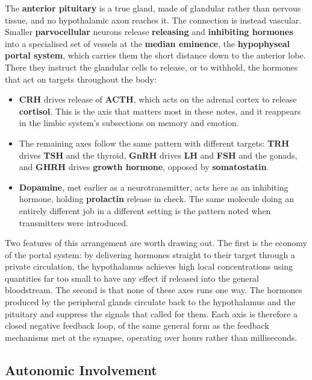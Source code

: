 \documentclass[11pt]{article}
\begin{document}
The \textbf{anterior pituitary} is a true gland, made of glandular rather than nervous tissue, and no hypothalamic axon reaches it. The connection is instead vascular. Smaller \textbf{parvocellular} neurons release \textbf{releasing} and \textbf{inhibiting hormones} into a specialised set of vessels at the \textbf{median eminence}, the \textbf{hypophyseal portal system}, which carries them the short distance down to the anterior lobe. There they instruct the glandular cells to release, or to withhold, the hormones that act on targets throughout the body:

\begin{itemize}
    \item \textbf{CRH} drives release of \textbf{ACTH}, which acts on the adrenal cortex to release \textbf{cortisol}. This is the axis that matters most in these notes, and it reappears in the limbic system's subsections on memory and emotion.
    \item The remaining axes follow the same pattern with different targets: \textbf{TRH} drives \textbf{TSH} and the thyroid, \textbf{GnRH} drives \textbf{LH} and \textbf{FSH} and the gonads, and \textbf{GHRH} drives \textbf{growth hormone}, opposed by \textbf{somatostatin}.
    \item \textbf{Dopamine}, met earlier as a neurotransmitter, acts here as an inhibiting hormone, holding \textbf{prolactin} release in check. The same molecule doing an entirely different job in a different setting is the pattern noted when transmitters were introduced.
\end{itemize}

Two features of this arrangement are worth drawing out. The first is the economy of the portal system: by delivering hormones straight to their target through a private circulation, the hypothalamus achieves high local concentrations using quantities far too small to have any effect if released into the general bloodstream. The second is that none of these axes runs one way. The hormones produced by the peripheral glands circulate back to the hypothalamus and the pituitary and suppress the signals that called for them. Each axis is therefore a closed negative feedback loop, of the same general form as the feedback mechanisms met at the synapse, operating over hours rather than milliseconds.

\subsection{Autonomic Involvement}
\end{document}
